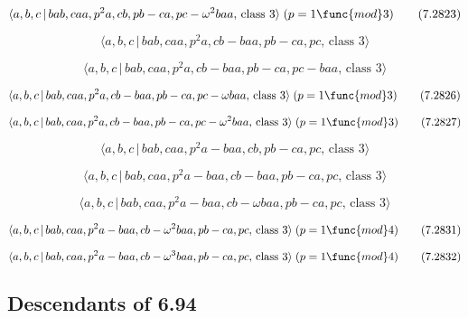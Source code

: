 \documentclass[10pt]{article}
\begin{document}
\begin{equation}
\langle a,b,c\,|\,bab,caa,p^{2}a,cb,pb-ca,pc-\omega ^{2}baa,\,\text{class }%
3\rangle \;(p=1\func{mod}3)  \tag{7.2823}
\end{equation}

\begin{equation}
\langle a,b,c\,|\,bab,caa,p^2a,cb-baa,pb-ca,pc,\,\text{class }3\rangle 
\tag{7.2824}
\end{equation}

\begin{equation}
\langle a,b,c\,|\,bab,caa,p^2a,cb-baa,pb-ca,pc-baa,\,\text{class }3\rangle 
\tag{7.2825}
\end{equation}

\begin{equation}
\langle a,b,c\,|\,bab,caa,p^{2}a,cb-baa,pb-ca,pc-\omega baa,\,\text{class }%
3\rangle \;(p=1\func{mod}3)  \tag{7.2826}
\end{equation}

\begin{equation}
\langle a,b,c\,|\,bab,caa,p^{2}a,cb-baa,pb-ca,pc-\omega ^{2}baa,\,\text{%
class }3\rangle \;(p=1\func{mod}3)  \tag{7.2827}
\end{equation}

\begin{equation}
\langle a,b,c\,|\,bab,caa,p^2a-baa,cb,pb-ca,pc,\,\text{class }3\rangle 
\tag{7.2828}
\end{equation}

\begin{equation}
\langle a,b,c\,|\,bab,caa,p^2a-baa,cb-baa,pb-ca,pc,\,\text{class }3\rangle 
\tag{7.2829}
\end{equation}

\begin{equation}
\langle a,b,c\,|\,bab,caa,p^{2}a-baa,cb-\omega baa,pb-ca,pc,\,\text{class }%
3\rangle  \tag{7.2830}
\end{equation}

\begin{equation}
\langle a,b,c\,|\,bab,caa,p^{2}a-baa,cb-\omega ^{2}baa,pb-ca,pc,\,\text{%
class }3\rangle \;(p=1\func{mod}4)  \tag{7.2831}
\end{equation}

\begin{equation}
\langle a,b,c\,|\,bab,caa,p^{2}a-baa,cb-\omega ^{3}baa,pb-ca,pc,\,\text{%
class }3\rangle \;(p=1\func{mod}4)  \tag{7.2832}
\end{equation}

\subsection{Descendants of 6.94}
\end{document}
